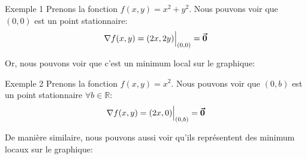 \documentclass[a4paper]{article}
\begin{document}
\begin{parag}{Exemple 1}
    Prenons la fonction $f\left(x, y\right) = x^2 + y^2$. Nous pouvons voir que $\left(0, 0\right)$ est un point stationnaire: 
    \[\nabla f\left(x, y\right) = \left(2x, 2y\right) \eval_{\left(0, 0\right)}^{} = \bvec{0}\]
    
    Or, nous pouvons voir que c'est un minimum local sur le graphique:
\end{parag}

\begin{parag}{Exemple 2}
    Prenons la fonction $f\left(x, y\right) = x^2$. Nous pouvons voir que $\left(0, b\right)$ est un point stationnaire $\forall b \in \mathbb{R}$: 
    \[\nabla f\left(x, y\right) = \left(2x, 0\right)\eval_{\left(0, b\right)}^{} = \bvec{0}\]
    
    De manière similaire, nous pouvons aussi voir qu'ils représentent des minimum locaux sur le graphique:
\end{parag}
\end{document}
